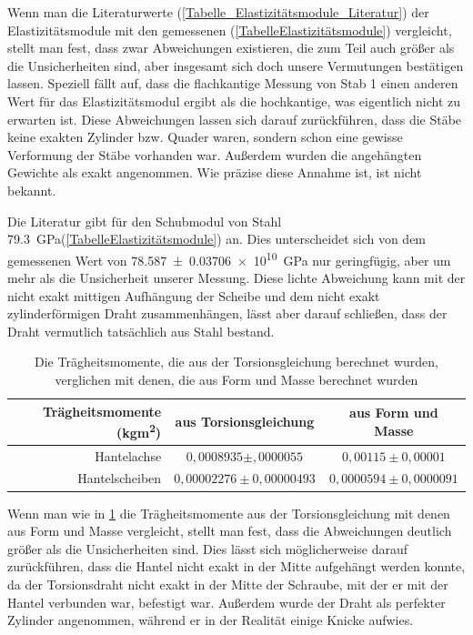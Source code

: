 \documentclass[
	a4paper,
	12pt,
	pagesize,
	ngerman
]{scrartcl}
\begin{document}
	Wenn man die Literaturwerte (\cref{Tabelle_Elastizitätsmodule_Literatur}) der Elastizitätsmodule mit den gemessenen (\cref{TabelleElastizitätsmodule}) vergleicht, stellt man fest, dass zwar Abweichungen existieren, die zum Teil auch größer als die Unsicherheiten sind, aber insgesamt sich doch unsere Vermutungen bestätigen lassen. Speziell fällt auf, dass die flachkantige Messung von Stab 1 einen anderen Wert für das Elastizitätsmodul ergibt als die hochkantige, was eigentlich nicht zu erwarten ist. Diese Abweichungen lassen sich darauf zurückführen, dass die Stäbe keine exakten Zylinder bzw. Quader waren, sondern schon eine gewisse Verformung der Stäbe vorhanden war. Außerdem wurden die angehängten Gewichte als exakt angenommen. Wie präzise diese Annahme ist, ist nicht bekannt.%
	\\
	\par
	Die Literatur gibt für den Schubmodul von Stahl \SI{79,3}{\giga \pascal}(\cref{TabelleElastizitätsmodule}) an. Dies unterscheidet sich von dem gemessenen Wert von \SI{78,587\pm 0,03706e10}{\giga \pascal} nur geringfügig, aber um mehr als die Unsicherheit unserer Messung. Diese lichte Abweichung kann mit der nicht exakt mittigen Aufhängung der Scheibe und dem nicht exakt zylinderförmigen Draht zusammenhängen, lässt aber darauf schließen, dass der Draht vermutlich tatsächlich aus Stahl bestand.
	\par
	\begin{table}[tb]
		\centering
		\begin{tabular}{ r | c | c |}
			Trägheitsmomente (\si{kgm^2})& aus Torsionsgleichung & aus Form und Masse\\ \hline
			Hantelachse & $0,0008935 \pm ,0000055$ &$ 0,00115 \pm0,00001$\\
			Hantelscheiben & $0,00002276 \pm 0,00000493$ & $0,0000594\pm 0,0000091$\\ \hline
		\end{tabular}
		\caption{Die Trägheitsmomente, die aus der Torsionsgleichung berechnet wurden, verglichen mit denen, die aus Form und Masse berechnet wurden}
		\label{Trägheitsmomente_Vergleich} 
	\end{table}
	
	Wenn man wie in \cref{Trägheitsmomente_Vergleich} die Trägheitsmomente aus der Torsionsgleichung mit denen aus Form und Masse vergleicht, stellt man fest, dass die Abweichungen deutlich größer als die Unsicherheiten sind. Dies lässt sich möglicherweise darauf zurückführen, dass die Hantel nicht exakt in der Mitte aufgehängt werden konnte, da der Torsionsdraht nicht exakt in der Mitte der Schraube, mit der er mit der Hantel verbunden war, befestigt war. Außerdem wurde der Draht als perfekter Zylinder angenommen, während er in der Realität einige Knicke aufwies. %
	
\end{document}
